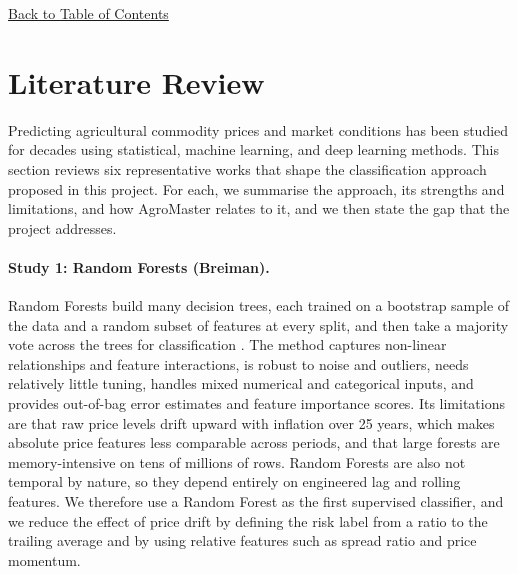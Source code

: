 \documentclass[12pt,a4paper]{article}
\begin{document}
\hyperref[contents]{\small Back to Table of Contents}
\newpage
\section{Literature Review }
Predicting agricultural commodity prices and market conditions has been studied for decades using statistical, machine learning, and deep learning methods. This section reviews six representative works that shape the classification approach proposed in this project. For each, we summarise the approach, its strengths and limitations, and how AgroMaster relates to it, and we then state the gap that the project addresses.

\paragraph{Study 1: Random Forests (Breiman).}
Random Forests build many decision trees, each trained on a bootstrap sample of the data and a random subset of features at every split, and then take a majority vote across the trees for classification \cite{breiman2001random}. The method captures non-linear relationships and feature interactions, is robust to noise and outliers, needs relatively little tuning, handles mixed numerical and categorical inputs, and provides out-of-bag error estimates and feature importance scores. Its limitations are that raw price levels drift upward with inflation over 25 years, which makes absolute price features less comparable across periods, and that large forests are memory-intensive on tens of millions of rows. Random Forests are also not temporal by nature, so they depend entirely on engineered lag and rolling features. We therefore use a Random Forest as the first supervised classifier, and we reduce the effect of price drift by defining the risk label from a ratio to the trailing average and by using relative features such as spread ratio and price momentum.
\end{document}
